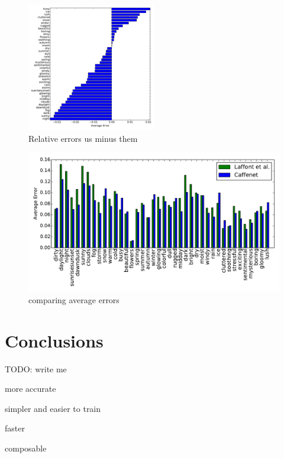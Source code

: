 \documentclass{article}
\begin{document}
\begin{figure}[t]
	\centering
		\includegraphics[width=0.5\textwidth]{figs/rel_err.pdf}
		\caption{Relative errors us minus them}\label{fig:relerr}
\end{figure}

\begin{figure}[t]
	\centering
		\includegraphics[width=1.0\textwidth]{figs/avg_err_compare.pdf}
		\caption{comparing average errors}\label{fig:compare}
\end{figure}


\section{Conclusions}

TODO: write me

more accurate

simpler and easier to train

faster

composable



\end{document}
